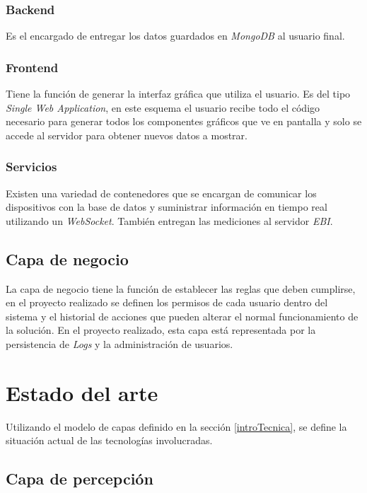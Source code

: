 		\subsubsection{Backend}
		
			Es el encargado de entregar los datos guardados en \emph{MongoDB} al usuario final.
		
		\subsubsection{Frontend}
		
			Tiene la función de generar la interfaz gráfica que utiliza el usuario. Es del tipo \emph{Single Web Application}, en este esquema el usuario recibe todo el código necesario para generar todos los componentes gráficos que ve en pantalla y solo se accede al servidor para obtener nuevos datos a mostrar.
		
		\subsubsection{Servicios}
		
			Existen una variedad de contenedores que se encargan de comunicar los dispositivos con la base de datos y suministrar información en tiempo real utilizando un \emph{WebSocket}. También entregan las mediciones al servidor \emph{EBI}.
	
	\subsection{Capa de negocio}
	\label{capaNegocio}
	
		La capa de negocio tiene la función de establecer las reglas que deben cumplirse, en el proyecto realizado se definen los permisos de cada usuario dentro del sistema y el historial de acciones que pueden alterar el normal funcionamiento de la solución. En el proyecto realizado, esta capa está representada por la persistencia de \emph{Logs} y la administración de usuarios.

\section{Estado del arte}
\label{estadoArte}

	Utilizando el modelo de capas definido en la sección \ref{introTecnica}, se define la situación actual de las tecnologías involucradas.
	
	\subsection{Capa de percepción}
	\label{artPercepcion}
	

